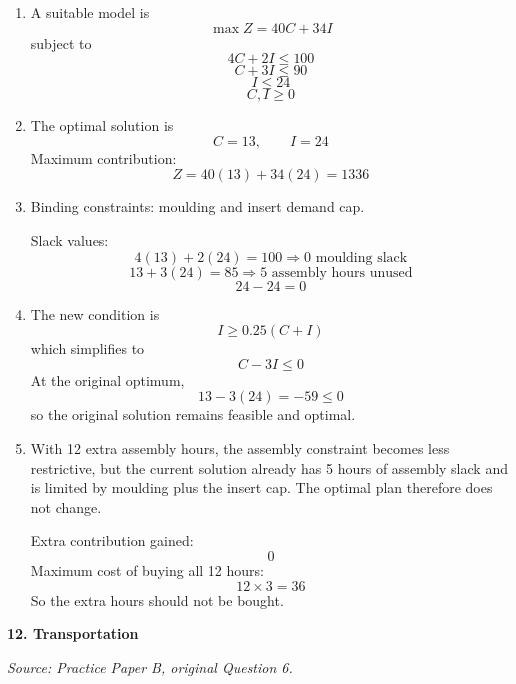 \documentclass[11pt,a4paper]{article}
\begin{document}
\begin{enumerate}
\item A suitable model is
\[
\max Z = 40C + 34I
\]
subject to
\[
4C + 2I \le 100
\]
\[
C + 3I \le 90
\]
\[
I \le 24
\]
\[
C,I \ge 0
\]

\item The optimal solution is
\[
C=13,\qquad I=24
\]
Maximum contribution:
\[
Z=40(13)+34(24)=1336
\]

\item Binding constraints: moulding and insert demand cap.

Slack values:
\[
4(13)+2(24)=100 \Rightarrow 0 \text{ moulding slack}
\]
\[
13+3(24)=85 \Rightarrow 5 \text{ assembly hours unused}
\]
\[
24-24=0
\]

\item The new condition is
\[
I \ge 0.25(C+I)
\]
which simplifies to
\[
C-3I \le 0
\]
At the original optimum,
\[
13-3(24)=-59 \le 0
\]
so the original solution remains feasible and optimal.

\item With 12 extra assembly hours, the assembly constraint becomes less restrictive, but the current solution already has 5 hours of assembly slack and is limited by moulding plus the insert cap. The optimal plan therefore does not change.

Extra contribution gained:
\[
0
\]
Maximum cost of buying all 12 hours:
\[
12 \times 3 = 36
\]
So the extra hours should not be bought.
\end{enumerate}

\newpage

\textbf{12. Transportation}

\textit{Source: Practice Paper B, original Question 6.}
\end{document}
